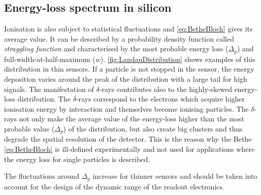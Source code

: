 \subsection{Energy-loss spectrum in silicon}
\label{sec:SiliconEnergyLossSpectrum}
Ionisation is also subject to statistical fluctuations and
\cref{eq:BetheBloch} gives its average value. It can be described by a
probability density function called \textit{straggling function} and
characterised by the most probable energy loss ($\Delta_{p}$) and
full-width-at-half-maximum ($w$). \cref{fig:LandauDistribution} shows
examples of this distribution in thin sensors. If a particle is not
stopped in the sensor, the energy deposition varies around the peak of
the distribution with a large tail for high signals. The manifestation
of $\delta$-rays contributes also to the highly-skewed energy-loss
distribution. The $\delta$-rays correspond to the electrons which
acquire higher ionisation energy by interaction and themselves become
ionising particles. The $\delta$-rays not only make the average value
of the energy-loss higher than the most probable value ($\Delta_{p}$)
of the distribution, but also create big clusters and thus degrade the
spatial resolution of the detector. This is the reason why the Bethe
\cref{eq:BetheBloch} is ill-defined experimentally and not used for
applications where the energy loss for single particles is described.

The fluctuations around $\Delta_{p}$ increase for thinner sensors and
should be taken into account for the design of the dynamic range of
the readout electronics.


